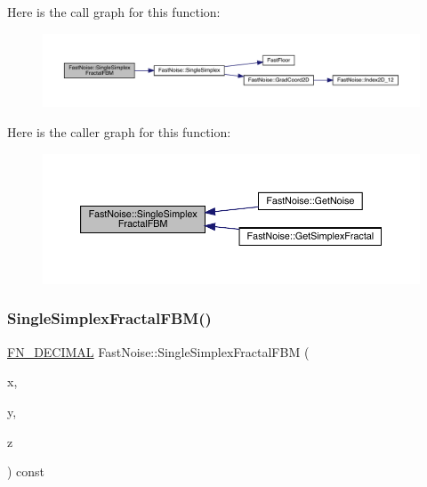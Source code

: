 Here is the call graph for this function\+:
\nopagebreak
\begin{figure}[H]
\begin{center}
\leavevmode
\includegraphics[width=350pt]{class_fast_noise_af7e3a4be65f1e27d1af76111a382adbc_cgraph}
\end{center}
\end{figure}
Here is the caller graph for this function\+:
\nopagebreak
\begin{figure}[H]
\begin{center}
\leavevmode
\includegraphics[width=350pt]{class_fast_noise_af7e3a4be65f1e27d1af76111a382adbc_icgraph}
\end{center}
\end{figure}
\mbox{\label{class_fast_noise_a2ac44ef2c9843f3024a3f0be9a47526b}} 
\subsubsection{\texorpdfstring{Single\+Simplex\+Fractal\+F\+B\+M()}{SingleSimplexFractalFBM()}\hspace{0.1cm}{\footnotesize\ttfamily [2/2]}}
{\footnotesize\ttfamily \mbox{\hyperlink{_fast_noise_8h_a75a9ef6d2541c4921815b885bfd449c3}{F\+N\+\_\+\+D\+E\+C\+I\+M\+AL}} Fast\+Noise\+::\+Single\+Simplex\+Fractal\+F\+BM (\begin{DoxyParamCaption}\item[{\mbox{\hyperlink{_fast_noise_8h_a75a9ef6d2541c4921815b885bfd449c3}{F\+N\+\_\+\+D\+E\+C\+I\+M\+AL}}}]{x,  }\item[{\mbox{\hyperlink{_fast_noise_8h_a75a9ef6d2541c4921815b885bfd449c3}{F\+N\+\_\+\+D\+E\+C\+I\+M\+AL}}}]{y,  }\item[{\mbox{\hyperlink{_fast_noise_8h_a75a9ef6d2541c4921815b885bfd449c3}{F\+N\+\_\+\+D\+E\+C\+I\+M\+AL}}}]{z }\end{DoxyParamCaption}) const\hspace{0.3cm}{\ttfamily [private]}}

